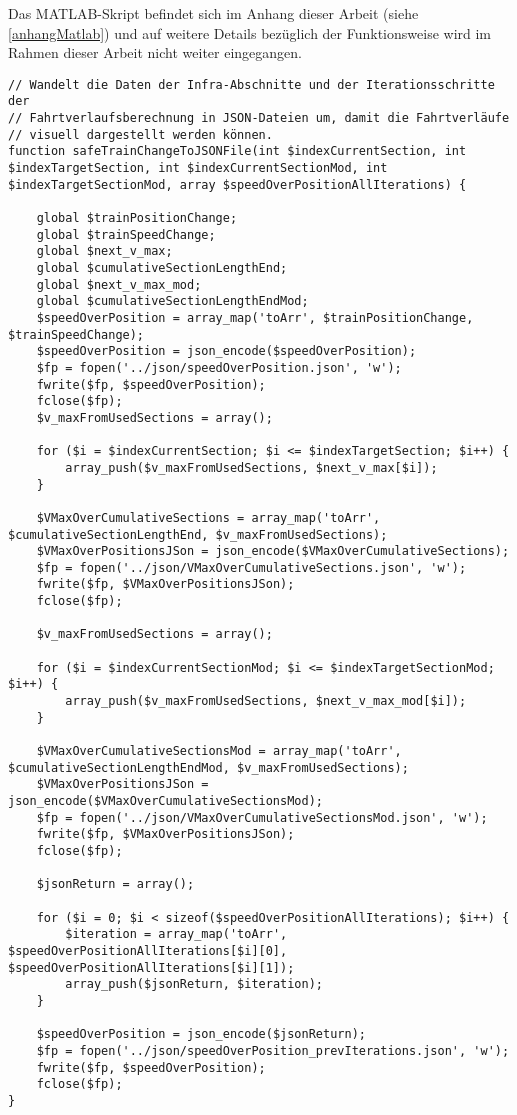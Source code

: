 Das MATLAB-Skript befindet sich im Anhang dieser Arbeit (siehe \ref{anhangMatlab}) und auf weitere Details bezüglich der Funktionsweise wird im Rahmen dieser Arbeit nicht weiter eingegangen.
\begin{lstlisting}[caption={\textit{safeTrainChangeToJSONFile$($$)$} (\textit{functions\_fahrtverlauf.php})},captionpos=b,label={lst:safeTrainChangeToJSONFile}]
// Wandelt die Daten der Infra-Abschnitte und der Iterationsschritte der
// Fahrtverlaufsberechnung in JSON-Dateien um, damit die Fahrtverläufe
// visuell dargestellt werden können.
function safeTrainChangeToJSONFile(int $indexCurrentSection, int $indexTargetSection, int $indexCurrentSectionMod, int $indexTargetSectionMod, array $speedOverPositionAllIterations) {

	global $trainPositionChange;
	global $trainSpeedChange;
	global $next_v_max;
	global $cumulativeSectionLengthEnd;
	global $next_v_max_mod;
	global $cumulativeSectionLengthEndMod;
	$speedOverPosition = array_map('toArr', $trainPositionChange, $trainSpeedChange);
	$speedOverPosition = json_encode($speedOverPosition);
	$fp = fopen('../json/speedOverPosition.json', 'w');
	fwrite($fp, $speedOverPosition);
	fclose($fp);
	$v_maxFromUsedSections = array();

	for ($i = $indexCurrentSection; $i <= $indexTargetSection; $i++) {
		array_push($v_maxFromUsedSections, $next_v_max[$i]);
	}

	$VMaxOverCumulativeSections = array_map('toArr', $cumulativeSectionLengthEnd, $v_maxFromUsedSections);
	$VMaxOverPositionsJSon = json_encode($VMaxOverCumulativeSections);
	$fp = fopen('../json/VMaxOverCumulativeSections.json', 'w');
	fwrite($fp, $VMaxOverPositionsJSon);
	fclose($fp);

	$v_maxFromUsedSections = array();

	for ($i = $indexCurrentSectionMod; $i <= $indexTargetSectionMod; $i++) {
		array_push($v_maxFromUsedSections, $next_v_max_mod[$i]);
	}

	$VMaxOverCumulativeSectionsMod = array_map('toArr', $cumulativeSectionLengthEndMod, $v_maxFromUsedSections);
	$VMaxOverPositionsJSon = json_encode($VMaxOverCumulativeSectionsMod);
	$fp = fopen('../json/VMaxOverCumulativeSectionsMod.json', 'w');
	fwrite($fp, $VMaxOverPositionsJSon);
	fclose($fp);

	$jsonReturn = array();

	for ($i = 0; $i < sizeof($speedOverPositionAllIterations); $i++) {
		$iteration = array_map('toArr', $speedOverPositionAllIterations[$i][0], $speedOverPositionAllIterations[$i][1]);
		array_push($jsonReturn, $iteration);
	}

	$speedOverPosition = json_encode($jsonReturn);
	$fp = fopen('../json/speedOverPosition_prevIterations.json', 'w');
	fwrite($fp, $speedOverPosition);
	fclose($fp);
}
\end{lstlisting}